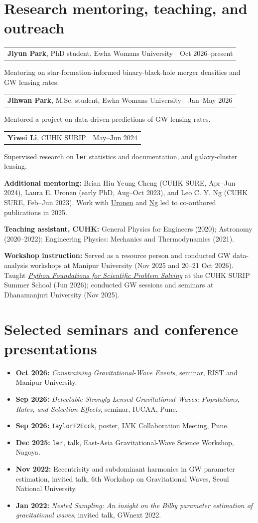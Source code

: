 \documentclass[10pt]{article}
\makeatletter
\newcommand{\dated}[2]{\par\noindent\begin{tabularx}{\linewidth}{@{}X r@{}}#1&#2\end{tabularx}\par}
\makeatother
\begin{document}
\section*{Research mentoring, teaching, and outreach}
\dated{\textbf{Jiyun Park}, PhD student, Ewha Womans University}{Oct 2026--present}
Mentoring on star-formation-informed binary-black-hole merger densities and GW lensing rates.
\dated{\textbf{Jihwan Park}, M.Sc. student, Ewha Womans University}{Jan--May 2026}
Mentored a project on data-driven predictions of GW lensing rates.
\dated{\textbf{Yiwei Li}, CUHK SURIP}{May--Jun 2024}
Supervised research on \texttt{ler} statistics and documentation, and galaxy-cluster lensing.

\textbf{Additional mentoring:} Brian Hiu Yeung Cheng (CUHK SURE, Apr--Jun 2024), Laura E. Uronen (early PhD, Aug--Oct 2023), and Leo C. Y. Ng (CUHK SURE, Feb--Jun 2023). Work with \href{https://arxiv.org/abs/2406.14257}{Uronen} and \href{https://arxiv.org/abs/2403.16532}{Ng} led to co-authored publications in 2025.

\textbf{Teaching assistant, CUHK:} General Physics for Engineers (2020); Astronomy (2020--2022); Engineering Physics: Mechanics and Thermodynamics (2021).

\textbf{Workshop instruction:} Served as a resource person and conducted GW data-analysis workshops at Manipur University (Nov 2025 and 20--21 Oct 2026). Taught \href{https://gw.phy.cuhk.edu.hk/activities/surip-summer-school-2026/}{\textit{Python Foundations for Scientific Problem Solving}} at the CUHK SURIP Summer School (Jun 2026); conducted GW sessions and seminars at Dhanamanjuri University (Nov 2025).
\section*{Selected seminars and conference presentations}
\begin{itemize}
\item \textbf{Oct 2026:} \textit{Constraining Gravitational-Wave Events}, seminar, RIST and Manipur University.
\item \textbf{Sep 2026:} \textit{Detectable Strongly Lensed Gravitational Waves: Populations, Rates, and Selection Effects}, seminar, IUCAA, Pune.
\item \textbf{Sep 2026:} \texttt{TaylorF2Ecck}, poster, LVK Collaboration Meeting, Pune.
\item \textbf{Dec 2025:} \texttt{ler}, talk, East-Asia Gravitational-Wave Science Workshop, Nagoya.
\item \textbf{Nov 2022:} Eccentricity and subdominant harmonics in GW parameter estimation, invited talk, 6th Workshop on Gravitational Waves, Seoul National University.
\item \textbf{Jan 2022:} \textit{Nested Sampling: An insight on the Bilby parameter estimation of gravitational waves}, invited talk, GWnext 2022.
\end{itemize}
\end{document}
